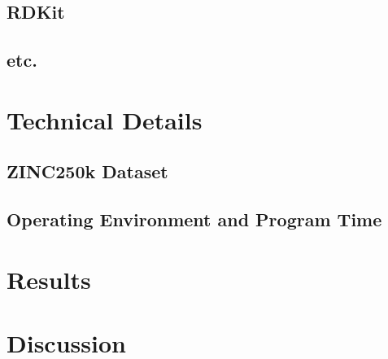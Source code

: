 \documentclass{article}
\begin{document}
\subsection{RDKit}
\subsection{etc.}
\section{Technical Details}
\subsection{ZINC250k Dataset}
\subsection{Operating Environment and Program Time}
\section{Results}
\section{Discussion}
\end{document}
